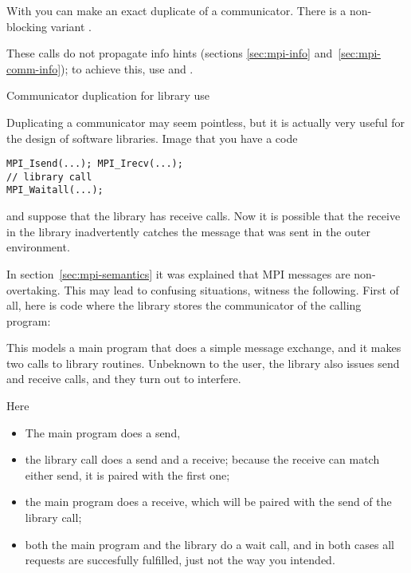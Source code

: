 
With  you can make an exact duplicate of a communicator.
There is a non-blocking variant .

These calls do not propagate info hints
(sections \ref{sec:mpi-info} and~\ref{sec:mpi-comm-info});
to achieve this,
use  and .

 {Communicator duplication for library use}

Duplicating a communicator may seem pointless, but it is actually very useful for the design of
software libraries. Image that you have a code
\lstset{style=reviewcode,language=C}
\begin{lstlisting}
MPI_Isend(...); MPI_Irecv(...);
// library call
MPI_Waitall(...);
\end{lstlisting}
and suppose that the library has receive calls. Now it is possible that the 
receive in the library inadvertently
catches the message that was sent in the outer environment.

In section~\ref{sec:mpi-semantics} it was explained that MPI messages are 
non-overtaking. This may lead to confusing situations, witness the following.
First of all, here is code where the library stores the communicator
of the calling program:
%

This models a main program that does a simple message exchange, and it
makes two calls to library routines. Unbeknown to the user, the
library also issues send and receive calls, and they turn out to
interfere.

Here
\begin{itemize}
\item The main program does a send,
\item the library call  does a send and a receive;
  because the receive can match either send, it is paired with the
  first one;
\item the main program does a receive, which will be paired with the send of the 
  library call;
\item both the main program and the library do a wait call, and in
  both cases all requests are succesfully fulfilled, just not the way
  you intended.
\end{itemize}

